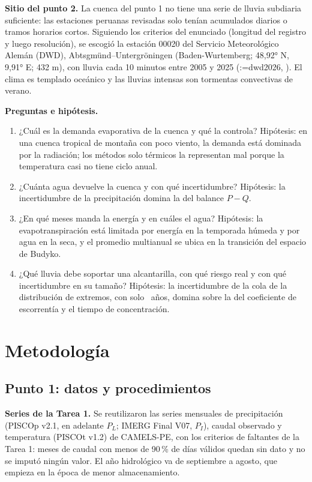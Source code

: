 \documentclass[12pt,a4paper]{article}
\makeatletter
\newcommand{\parencite}[2][]{(\@tempswafalse\@for\rk:=#2\do{\if@tempswa; \fi\@tempswatrue\csname rA@\rk\endcsname, \csname rY@\rk\endcsname}\ifx\relax#1\relax\else, #1\fi)}
\makeatother
\begin{document}
\textbf{Sitio del punto 2.} La cuenca del punto 1 no tiene una serie de lluvia subdiaria suficiente: las estaciones peruanas revisadas solo tenían acumulados diarios o tramos horarios cortos. Siguiendo los criterios del enunciado (longitud del registro y luego resolución), se escogió la estación 00020 del Servicio Meteorológico Alemán (DWD), Abtsgmünd--Untergröningen (Baden-Wurtemberg; 48,92° N, 9,91° E; 432 m), con lluvia cada 10 minutos entre 2005 y 2025 \parencite{dwd2026}. El clima es templado oceánico y las lluvias intensas son tormentas convectivas de verano.

\textbf{Preguntas e hipótesis.}
\begin{enumerate}
\item ¿Cuál es la demanda evaporativa de la cuenca y qué la controla? Hipótesis: en una cuenca tropical de montaña con poco viento, la demanda está dominada por la radiación; los métodos solo térmicos la representan mal porque la temperatura casi no tiene ciclo anual.
\item ¿Cuánta agua devuelve la cuenca y con qué incertidumbre? Hipótesis: la incertidumbre de la precipitación domina la del balance $P-Q$.
\item ¿En qué meses manda la energía y en cuáles el agua? Hipótesis: la evapotranspiración está limitada por energía en la temporada húmeda y por agua en la seca, y el promedio multianual se ubica en la transición del espacio de Budyko.
\item ¿Qué lluvia debe soportar una alcantarilla, con qué riesgo real y con qué incertidumbre en su tamaño? Hipótesis: la incertidumbre de la cola de la distribución de extremos, con solo \NAnios\ años, domina sobre la del coeficiente de escorrentía y el tiempo de concentración.
\end{enumerate}

\section{Metodología}

\subsection{Punto 1: datos y procedimientos}

\textbf{Series de la Tarea 1.} Se reutilizaron las series mensuales de precipitación (PISCOp v2.1, en adelante $P_L$; IMERG Final V07, $P_I$), caudal observado y temperatura (PISCOt v1.2) de CAMELS-PE, con los criterios de faltantes de la Tarea 1: meses de caudal con menos de 90\,\% de días válidos quedan sin dato y no se imputó ningún valor. El año hidrológico va de septiembre a agosto, que empieza en la época de menor almacenamiento.
\end{document}
